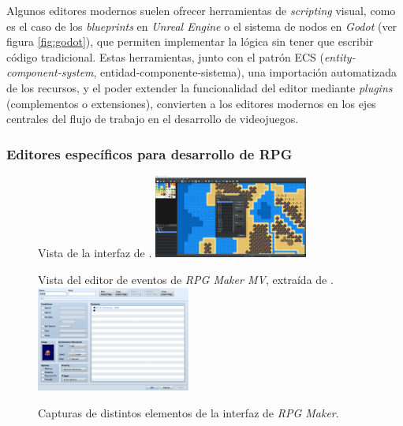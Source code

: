 \medskip


Algunos editores modernos suelen ofrecer herramientas de \textit{scripting} visual, como es el caso de los \textit{blueprints} en \textit{Unreal Engine} o el sistema de nodos en \textit{Godot} (ver figura \ref{fig:godot}), que permiten implementar la lógica sin tener que escribir código tradicional. Estas herramientas, junto con el patrón ECS (\textit{entity-component-system}, entidad-componente-sistema), una importación automatizada de los recursos, y el poder extender la funcionalidad del editor mediante \textit{plugins} (complementos o extensiones), convierten a los editores modernos en los ejes centrales del flujo de trabajo en el desarrollo de videojuegos.

\subsubsection{Editores específicos para desarrollo de RPG}

\begin{figure}[h]
\centering
\begin{SubFloat}
{\label{fig:rpgmakermz}%
	Vista de la interfaz de \cite{rpgmakermz}.}%
	\includegraphics[width=0.45\textwidth]{Imagenes/Bitmap/rpgmakermz}%
\end{SubFloat}
\qquad
\begin{SubFloat}
{\label{fig:rpgmakerevent}%
	Vista del editor de eventos de \textit{RPG Maker MV}, extraída de \cite{rpgmakerevent}.}%
	\includegraphics[width=0.45\textwidth]{Imagenes/Bitmap/rpgmakereventeditor}%
\end{SubFloat}
\caption{Capturas de distintos elementos de la interfaz de \textit{RPG Maker}. \label{fig:rpgmaker}}
\end{figure}

